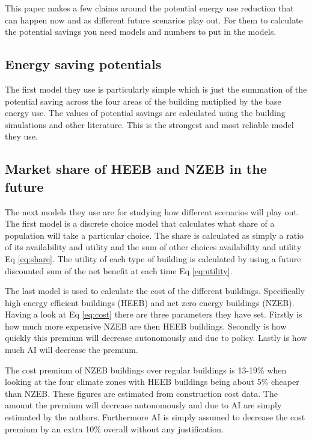 \documentclass[conference,a4paper]{IEEEtran}
\begin{document}
This paper makes a few claims around the potential energy use reduction that can happen now and as different future scenarios play out. For them to calculate the potential savings you need models and numbers to put in the models.

\subsection*{Energy saving potentials}

The first model they use is particularly simple which is just the summation of the potential saving across the four areas of the building mutiplied by the base energy use. The values of potential savings are calculated using the building simulations and other literature. This is the strongest and most reliable model they use.

\subsection*{Market share of HEEB and NZEB in the future}

The next models they use are for studying how different scenarios will play out. The first model is a discrete choice model that calculates what share of a population will take a particular choice. The share is calculated as simply a ratio of its availability and utility and the sum of other choices availability and utility Eq \ref{eq:share}. The utility of each type of building is calculated by using a future discounted sum of the net benefit at each time Eq \ref{eq:utility}.

The last model is used to calculate the cost of the different buildings. Specifically high energy efficient buildings (HEEB) and net zero energy buildings (NZEB). Having a look at Eq \ref{eq:cost} there are three parameters they have set. Firstly is how much more expensive NZEB are then HEEB buildings. Secondly is how quickly this premium will decrease autonomously and due to policy. Lastly is how much AI will decrease the premium.

The cost premium of NZEB buildings over regular buildings is 13-19\% when looking at the four climate zones with HEEB buildings being about 5\% cheaper than NZEB. These figures are estimated from construction cost data. The amount the premium will decrease autonomously and due to AI are simply estimated by the authors. Furthermore AI is simply assumed to decrease the cost premium by an extra 10\% overall without any justification.
\end{document}
